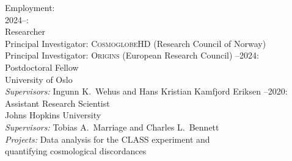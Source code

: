 \documentclass[a4paper]{resume}
\author{Duncan Joseph Watts}
\begin{document}
\maketitle




\begin{category}{Employment:}
\citemnobullet\\
2024--:\\
Researcher\\
Principal Investigator: \textsc{CosmoglobeHD} (Research Council of Norway)\\
Principal Investigator: \textsc{Origins} (European Research Council)
--2024:\\
Postdoctoral Fellow\\
University of Oslo\\
\qquad \textsl{Supervisors:} Ingunn K.~Wehus and Hans Kristian Kamfjord
    Eriksen
--2020:\\
Assistant Research Scientist\\
Johns Hopkins University\\
\qquad \textsl{Supervisors:} Tobias A.~Marriage and Charles
L.~Bennett\\
\qquad \textsl{Projects:} Data analysis for the CLASS experiment and\\
\qquad {} quantifying cosmological discordances
\end{category}

\end{document}
